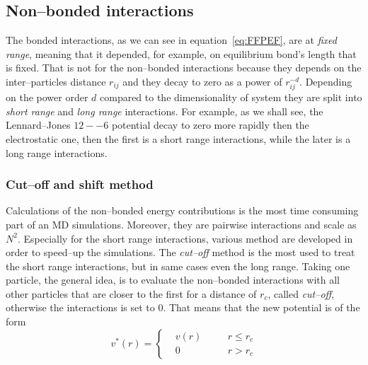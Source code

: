 \subsection{Non--bonded interactions}
\label{sec:nonbonded}
The bonded interactions, as we can see in equation~\eqref{eq:FFPEF}, are at \textit{fixed range}, meaning that it depended, for example, on equilibrium bond's length that is fixed. That is not for the non--bonded interactions because they depends on the inter--particles distance $r_{ij}$ and they decay to zero as a power of $r_{ij}^{-d}$. Depending on the power order $d$ compared to the dimensionality of system they are split into \textit{short range} and \textit{long range} interactions. For example, as we shall see, the Lennard--Jones $12--6$ potential decay to zero more rapidly then the electrostatic one, then the first is a short range interactions, while the later is a long range interactions.

\subsubsection{Cut--off and shift method}
Calculations of the non--bonded energy contributions is the most time consuming part of an \ac{MD} simulations. Moreover, they are pairwise interactions and scale as $N^2$. Especially for the short range interactions, various method are developed in order to speed--up the simulations. The \textit{cut--off} method is the most used to treat the short range interactions, but in same cases even the long range. Taking one particle, the general idea, is to evaluate the non--bonded interactions with all other particles that are closer to the first for a distance of $r_c$, called \textit{cut--off}, otherwise the interactions is set to $0$. That means that the new potential is of the form
\begin{equation*}
v^*(r) = \left \{
	\begin{aligned}
&v(r) & \quad & r \le r_c \\
&0    & \quad & r >   r_c
	\end{aligned} \right .
\end{equation*}

